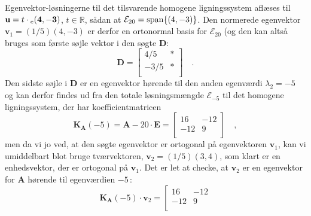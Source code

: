 \begin{example}
Egenvektor-løsningerne til det tilsvarende homogene ligningssystem aflæses til $\mathbf{u} = t\cdot{_\mathrm{e}\mathbf{(4, -3)}}$, $t \in \mathbb{R}$, sådan at $\mathcal{E}_{20}= \mathrm{span}\{(4,-3)\}$. Den normerede egenvektor $\mathbf{v}_{1} = (1/5)(4, -3)$ er derfor en ortonormal basis for $\mathcal{E}_{20}$ (og den kan altså bruges som første søjle vektor i den søgte $\mathbf{D}$:
\begin{equation}
\mathbf{D}= \left[
              \begin{array}{rr}
                4/5 & * \\
                -3/5 &  * \\
              \end{array}
            \right]
\quad .
\end{equation}
Den sidste søjle i $\mathbf{D}$ er en egenvektor hørende til den anden egenværdi $\lambda_{2} = -5$ og kan derfor findes ud fra den totale løsningsmængde $\mathcal{E}_{-5}$ til det homogene ligningssystem, der har koefficientmatricen
\begin{equation}
\mathbf{K}_{\mathbf{A}}(-5) = \mathbf{A} - 20\cdot\mathbf{E} = \left[
                                                            \begin{array}{rr}
                                                              16 & -12 \\
                                                              -12 & 9 \\
                                                            \end{array}
                                                          \right]
 \quad ,
\end{equation}
men da vi jo ved, at den søgte egenvektor er ortogonal på egenvektoren $\mathbf{v}_{1}$, kan vi umiddelbart blot bruge tværvektoren, $\mathbf{v}_{2}= (1/5)(3, 4)$, som klart er en enhedsvektor, der er ortogonal på $\mathbf{v}_{1}$. Det er let at checke, at $\mathbf{v}_{2}$ er en egenvektor for $\mathbf{A}$ hørende til egenværdien $-5$\,:
\begin{equation}
\mathbf{K}_{\mathbf{A}}(-5)\cdot\mathbf{v}_{2} =  \left[
                                                            \begin{array}{rr}
                                                              16 & -12 \\
                                                              -12 & 9 \\
                                                            \end{array}

\end{equation}
\end{example}

